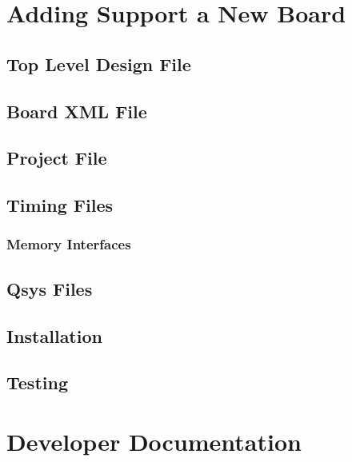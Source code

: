 \documentclass{refrep}
\begin{document}
\pagebreak
\chapter{Adding Support a New Board}
\label{Chapter:Adding}
\section{Top Level Design File}
\label{Chapter:Adding:Section:Top}
\section{Board XML File}
\label{Chapter:Adding:Section:XML}

\section{Project File}
\label{Chapter:Adding:Section:Project}
\section{Timing Files}
\label{Chapter:Adding:Section:Timing}
\subsection{Memory Interfaces}
\label{Chapter:Adding:Section:Project:Sub:Memories}
\section{Qsys Files}
\label{Chapter:Adding:Section:Qsys}
\section{Installation}
\label{Chapter:Adding:Section:Installation}
\section{Testing}
\label{Chapter:Adding:Section:Testing}
\pagebreak
\chapter{Developer Documentation}
\label{Chap:Tinker:Adding}
\end{document}
